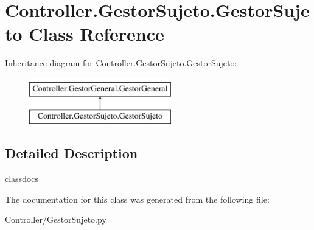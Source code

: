 \hypertarget{class_controller_1_1_gestor_sujeto_1_1_gestor_sujeto}{}\section{Controller.\+Gestor\+Sujeto.\+Gestor\+Sujeto Class Reference}
\label{class_controller_1_1_gestor_sujeto_1_1_gestor_sujeto}
Inheritance diagram for Controller.\+Gestor\+Sujeto.\+Gestor\+Sujeto\+:\begin{figure}[H]
\begin{center}
\leavevmode
\includegraphics[height=2.000000cm]{class_controller_1_1_gestor_sujeto_1_1_gestor_sujeto}
\end{center}
\end{figure}


\subsection{Detailed Description}
\begin{DoxyVerb}classdocs
\end{DoxyVerb}
 

The documentation for this class was generated from the following file\+:\begin{DoxyCompactItemize}
\item 
Controller/Gestor\+Sujeto.\+py\end{DoxyCompactItemize}
